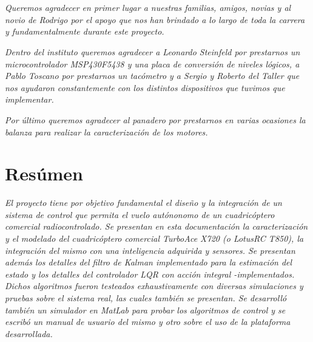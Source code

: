 \documentclass[main]{subfiles}
\begin{document}
\chapter*{}
\begin{flushright}
\textit{
Queremos agradecer en primer lugar a nuestras familias, amigos, novias 
y al novio de Rodrigo por el apoyo que nos han brindado a lo largo de
toda la carrera y fundamentalmente durante este proyecto.}
\end{flushright}

\begin{flushright}
\textit{
Dentro del instituto queremos agradecer a Leonardo Steinfeld por prestarnos un microcontrolador MSP430F5438 y una placa de 
conversi\'on de niveles l\'ogicos, a Pablo Toscano por prestarnos un tac\'ometro y a Sergio y Roberto del Taller que nos ayudaron constantemente con los distintos dispositivos que tuvimos que implementar.
}
\end{flushright} 

\begin{flushright}
\textit{
Por \'ultimo queremos agradecer al panadero por prestarnos en varias ocasiones la balanza para realizar la caracterizaci\'on de los motores.
}
\end{flushright}



\chapter*{Res\'umen}
\begin{flushright}
\textit{El proyecto tiene por objetivo fundamental el diseño y la integración de un sistema de control que permita el vuelo autónonomo de un cuadricóptero comercial radiocontrolado. Se presentan en esta documentaci\'on la caracterizaci\'on y el modelado del cuadric\'optero comercial TurboAce X720 (o LotusRC T850), la integraci\'on del mismo con una inteligencia adquirida y sensores. Se presentan adem\'as los detalles del filtro de Kalman implementado para la estimaci\'on del estado y los detalles del controlador LQR con acci\'on integral -implementados. Dichos algoritmos fueron testeados exhaustivamente con diversas simulaciones y pruebas sobre el sistema real, las cuales tambi\'en se presentan. Se desarroll\'o tambi\'en un simulador en \emph{MatLab} para probar los algoritmos de control y se escrib\'o un manual de usuario del mismo y otro sobre el uso de la plataforma desarrollada.
}
\end{flushright}
\end{document}
